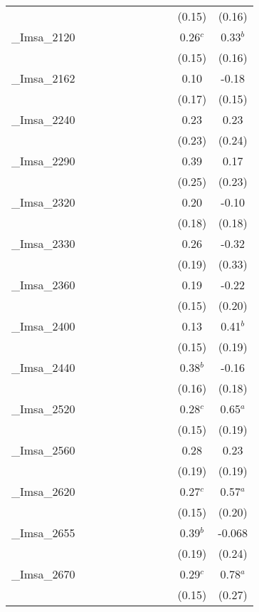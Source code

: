 \documentclass[]{article}
\begin{document}
\begin{tabular}{lcccccccccc}
 &  &  &  &  &  &  &  &  & (0.15) & (0.16) \\
\_Imsa\_2120 &  &  &  &  &  &  &  &  & 0.26$^c$ & 0.33$^b$ \\
 &  &  &  &  &  &  &  &  & (0.15) & (0.16) \\
\_Imsa\_2162 &  &  &  &  &  &  &  &  & 0.10 & -0.18 \\
 &  &  &  &  &  &  &  &  & (0.17) & (0.15) \\
\_Imsa\_2240 &  &  &  &  &  &  &  &  & 0.23 & 0.23 \\
 &  &  &  &  &  &  &  &  & (0.23) & (0.24) \\
\_Imsa\_2290 &  &  &  &  &  &  &  &  & 0.39 & 0.17 \\
 &  &  &  &  &  &  &  &  & (0.25) & (0.23) \\
\_Imsa\_2320 &  &  &  &  &  &  &  &  & 0.20 & -0.10 \\
 &  &  &  &  &  &  &  &  & (0.18) & (0.18) \\
\_Imsa\_2330 &  &  &  &  &  &  &  &  & 0.26 & -0.32 \\
 &  &  &  &  &  &  &  &  & (0.19) & (0.33) \\
\_Imsa\_2360 &  &  &  &  &  &  &  &  & 0.19 & -0.22 \\
 &  &  &  &  &  &  &  &  & (0.15) & (0.20) \\
\_Imsa\_2400 &  &  &  &  &  &  &  &  & 0.13 & 0.41$^b$ \\
 &  &  &  &  &  &  &  &  & (0.15) & (0.19) \\
\_Imsa\_2440 &  &  &  &  &  &  &  &  & 0.38$^b$ & -0.16 \\
 &  &  &  &  &  &  &  &  & (0.16) & (0.18) \\
\_Imsa\_2520 &  &  &  &  &  &  &  &  & 0.28$^c$ & 0.65$^a$ \\
 &  &  &  &  &  &  &  &  & (0.15) & (0.19) \\
\_Imsa\_2560 &  &  &  &  &  &  &  &  & 0.28 & 0.23 \\
 &  &  &  &  &  &  &  &  & (0.19) & (0.19) \\
\_Imsa\_2620 &  &  &  &  &  &  &  &  & 0.27$^c$ & 0.57$^a$ \\
 &  &  &  &  &  &  &  &  & (0.15) & (0.20) \\
\_Imsa\_2655 &  &  &  &  &  &  &  &  & 0.39$^b$ & -0.068 \\
 &  &  &  &  &  &  &  &  & (0.19) & (0.24) \\
\_Imsa\_2670 &  &  &  &  &  &  &  &  & 0.29$^c$ & 0.78$^a$ \\
 &  &  &  &  &  &  &  &  & (0.15) & (0.27) \\

\end{tabular}
\end{document}
